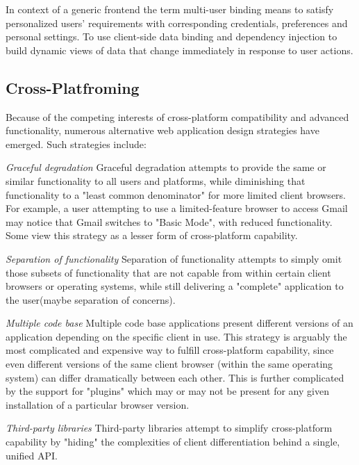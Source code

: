 	In context of a generic frontend the term multi-user binding means to satisfy personalized users' requirements with corresponding credentials, preferences and personal settings. To use client-side data binding and dependency injection to build dynamic views of data that change immediately in response to user actions.

\subsection {Cross-Platfroming}
	Because of the competing interests of cross-platform compatibility and advanced functionality, numerous alternative web application design strategies have emerged. Such strategies include:

	\emph{Graceful degradation}
	\newline
	Graceful degradation attempts to provide the same or similar functionality to all users and platforms, while diminishing that functionality to a "least common denominator" for more limited client browsers. For example, a user attempting to use a limited-feature browser to access Gmail may notice that Gmail switches to "Basic Mode", with reduced functionality. Some view this strategy as a lesser form of cross-platform capability.

	\emph{Separation of functionality}
	\newline
	Separation of functionality attempts to simply omit those subsets of functionality that are not capable from within certain client browsers or operating systems, while still delivering a "complete" application to the user(maybe separation of concerns).

	\emph{Multiple code base}
	\newline
	Multiple code base applications present different versions of an application depending on the specific client in use. This strategy is arguably the most complicated and expensive way to fulfill cross-platform capability, since even different versions of the same client browser (within the same operating system) can differ dramatically between each other. This is further complicated by the support for "plugins" which may or may not be present for any given installation of a particular browser version.

	\emph{Third-party libraries}
	\newline
	Third-party libraries attempt to simplify cross-platform capability by "hiding" the complexities of client differentiation behind a single, unified API.


